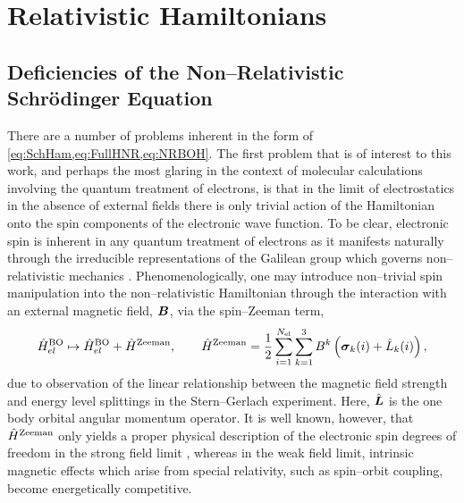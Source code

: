 \section{Relativistic Hamiltonians}
\label{sec:RELH}


\subsection{Deficiencies of the Non--Relativistic Schr\"{o}dinger Equation}
\label{sec:DefNRSch}


There are a number of problems inherent in the form of \cref{eq:SchHam,eq:FullHNR,eq:NRBOH}. The first problem that is of interest to this work,
and perhaps the most glaring in the context of molecular calculations involving the quantum treatment of electrons,
is that in the limit of electrostatics in the absence of external fields there is only trivial action of the
Hamiltonian onto the spin components of the electronic  wave function. To be clear, electronic spin is inherent in any quantum
treatment of electrons as it manifests naturally through the irreducible representations of the Galilean group
which governs non--relativistic mechanics \cite{Levy67_286}.  Phenomenologically, one may introduce non--trivial spin manipulation into the non--relativistic
Hamiltonian through the interaction with an external magnetic field, $\boldsymbol{B}$, via the spin--Zeeman term,
\begin{equation}
\hat{H}^{\mathrm{BO}}_{el} \mapsto  \hat{H}^{\mathrm{BO}}_{el} + \hat{H}^\mathrm{Zeeman}, \qquad \hat{H}^\mathrm{Zeeman}  = 
  \frac{1}{2} \sum_{i = 1}^{N_\mathrm{el}}\sum_{k=1}^3 B^k \left( \boldsymbol{\sigma}_{k}(i) + \hat{L}_k(i) \right),
\end{equation}
due to observation of the linear relationship between the magnetic field strength and energy level splittings in the Stern--Gerlach 
experiment\cite{Napolitano17_book}. Here, $\hat{\boldsymbol{L}}$ is the one body orbital angular momentum operator. 
It is well known, however, that $\hat{H}^\mathrm{Zeeman}$ only yields a proper physical description
of the electronic spin degrees of freedom in the strong field limit , whereas in the weak field limit, intrinsic magnetic
effects which arise from special relativity, such as spin--orbit coupling, become energetically competitive.

